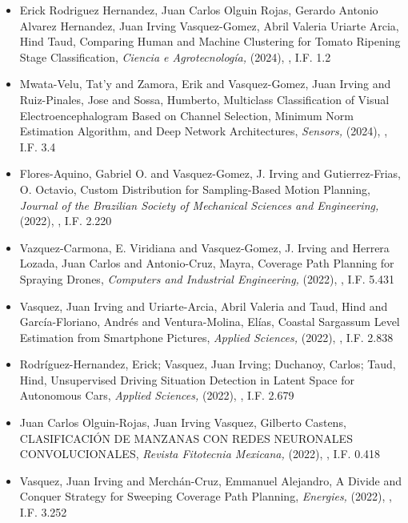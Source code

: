 \begin{itemize}
\item Erick Rodriguez Hernandez, Juan Carlos Olguin Rojas, Gerardo Antonio Alvarez Hernandez, Juan Irving Vasquez-Gomez, Abril Valeria Uriarte Arcia, Hind Taud, Comparing Human and Machine Clustering for Tomato Ripening Stage Classification,\textit{ Ciencia e Agrotecnología,} (2024), \href{https://doi.org/10.1590/1413-7054202448019123} {\faFilePdfO}, I.F. 1.2 
\item Mwata-Velu, Tat’y and Zamora, Erik and Vasquez-Gomez, Juan Irving and Ruiz-Pinales, Jose and Sossa, Humberto, Multiclass Classification of Visual Electroencephalogram Based on Channel Selection, Minimum Norm Estimation Algorithm, and Deep Network Architectures,\textit{ Sensors,} (2024), \href{https://doi.org/10.3390/s24123968} {\faFilePdfO}, I.F. 3.4 
\item Flores-Aquino, Gabriel O. and Vasquez-Gomez, J. Irving and Gutierrez-Frias, O. Octavio, Custom Distribution for Sampling-Based Motion Planning,\textit{ Journal of the Brazilian Society of Mechanical Sciences and Engineering,} (2022), \href{https://doi.org/10.1007/s40430-022-03379-0} {\faFilePdfO}, I.F. 2.220 
\item Vazquez-Carmona, E. Viridiana and Vasquez-Gomez, J. Irving and Herrera Lozada, Juan Carlos and Antonio-Cruz, Mayra, Coverage Path Planning for Spraying Drones,\textit{ Computers and Industrial Engineering,} (2022), \href{https://doi.org/10.1016/j.cie.2022.108125} {\faFilePdfO}, I.F. 5.431 
\item Vasquez, Juan Irving and Uriarte-Arcia, Abril Valeria and Taud, Hind and García-Floriano, Andrés and Ventura-Molina, Elías, Coastal Sargassum Level Estimation from Smartphone Pictures,\textit{ Applied Sciences,} (2022), \href{https://doi.org/10.3390/app121910012} {\faFilePdfO}, I.F. 2.838 
\item Rodríguez-Hernandez, Erick; Vasquez, Juan Irving; Duchanoy, Carlos; Taud, Hind, Unsupervised Driving Situation Detection in Latent Space for Autonomous Cars,\textit{ Applied Sciences,} (2022), \href{https://doi.org/10.3390/app12073635} {\faFilePdfO}, I.F. 2.679 
\item Juan Carlos Olguin-Rojas, Juan Irving Vasquez, Gilberto Castens, CLASIFICACIÓN DE MANZANAS CON REDES NEURONALES CONVOLUCIONALES,\textit{ Revista Fitotecnia Mexicana,} (2022), \href{https://doi.org/10.35196/rfm.2022.3.369} {\faFilePdfO}, I.F. 0.418 
\item Vasquez, Juan Irving and Merchán-Cruz, Emmanuel Alejandro, A Divide and Conquer Strategy for Sweeping Coverage Path Planning,\textit{ Energies,} (2022), \href{https://doi.org/10.3390/en15217898} {\faFilePdfO}, I.F. 3.252 

\end{itemize}
